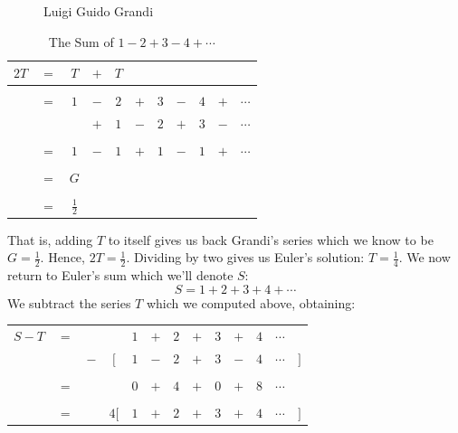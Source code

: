 \begin{example}
\begin{minipage}[c]{0.4\textwidth}
\begin{figure}[H]
                \fi
                \caption{Luigi Guido Grandi}
                \label{photo:GuidoGrandi}
            \end{figure}
        \end{minipage}
        \begin{table}[H]
            \centering
            \captionsetup{type=table}
            \begin{tabular}{ccccccccccc}
                $2T$&$=$&$T$&$+$&$T$\\
                    \hline\\
                    &$=$&$1$&$-$&$2$&$+$&$3$&$-$&$4$&$+$&$\cdots$\\
                    &   &   &$+$&$1$&$-$&$2$&$+$&$3$&$-$&$\cdots$\\
                \hline\\
                    &$=$&$1$&$-$&$1$&$+$&$1$&$-$&$1$&$+$&$\cdots$\\
                \hline\\
                &$=$&$G$\\
                \hline\\
                &$=$&$\frac{1}{2}$
            \end{tabular}
            \caption{The Sum of $1-2+3-4+\cdots$}
        \end{table}
        That is, adding $T$ to itself gives us back Grandi's series which we
        know to be $G=\frac{1}{2}$. Hence, $2T=\frac{1}{2}$. Dividing by two
        gives us Euler's solution: $T=\frac{1}{4}$. We now return to Euler's sum
        which we'll denote $S$:
        \begin{equation}
            S=1+2+3+4+\cdots
        \end{equation}
        We subtract the series $T$ which we computed above, obtaining:
        \begin{table}[H]
            \centering
            \captionsetup{type=table}
            \begin{tabular}{ccccccccccccc}
                $S-T$&$=$&&       &$1$&$+$&$2$&$+$&$3$&$+$&$4$&$\cdots$\\
                     &&$-$&$\Big[$&$1$&$-$&$2$&$+$&$3$&$-$&$4$&$\cdots$&$\Big]$
                \\[1ex]
                \hline\\
                     &$=$&&&$0$&$+$&$4$&$+$&$0$&$+$&$8$&$\cdots$\\[1ex]
                \hline\\
                &$=$&&$4\Big[$&$1$&$+$&$2$&$+$&$3$&$+$&$4$&$\cdots$&$\Big]$

\end{tabular}
\end{table}
\end{example}
